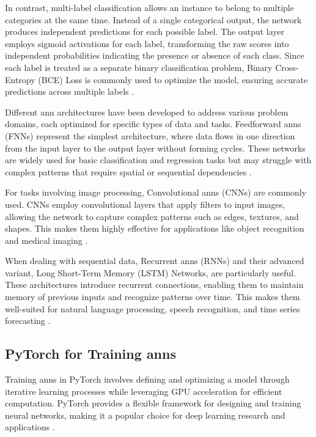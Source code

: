 In contrast, multi-label classification allows an instance to belong to multiple categories at the same time.
Instead of a single categorical output, the network produces independent predictions for each possible label.
The output layer employs sigmoid activations for each label, transforming the raw scores into independent probabilities indicating the presence or absence of each class.
Since each label is treated as a separate binary classification problem, Binary Cross-Entropy (BCE) Loss is commonly used to optimize the model, ensuring accurate predictions across multiple labels \cite{russell2016artificial,herrera2016multilabel}.

Different \ac{ann} architectures have been developed to address various problem domains, each optimized for specific types of data and tasks.
Feedforward \ac{ann}s (FNNs) represent the simplest architecture, where data flows in one direction from the input layer to the output layer without forming cycles.
These networks are widely used for basic classification and regression tasks but may struggle with complex patterns that require spatial or sequential dependencies \cite{russell2016artificial,glorot2010understanding}.

For tasks involving image processing, Convolutional \ac{ann}s (CNNs) are commonly used.
CNNs employ convolutional layers that apply filters to input images, allowing the network to capture complex patterns such as edges, textures, and shapes.
This makes them highly effective for applications like object recognition and medical imaging \cite{o2015introduction}.

When dealing with sequential data, Recurrent \ac{ann}s (RNNs) and their advanced variant, Long Short-Term Memory (LSTM) Networks, are particularly useful.
These architectures introduce recurrent connections, enabling them to maintain memory of previous inputs and recognize patterns over time.
This makes them well-suited for natural language processing, speech recognition, and time series forecasting \cite{medsker2001recurrent}.

\subsection{PyTorch for Training \ac{ann}s} \label{sec:pytorch}

Training \ac{ann}s in PyTorch involves defining and optimizing a model through iterative learning processes while leveraging GPU acceleration for efficient computation.
PyTorch provides a flexible framework for designing and training neural networks, making it a popular choice for deep learning research and applications \cite{pytorchPyTorch}.

